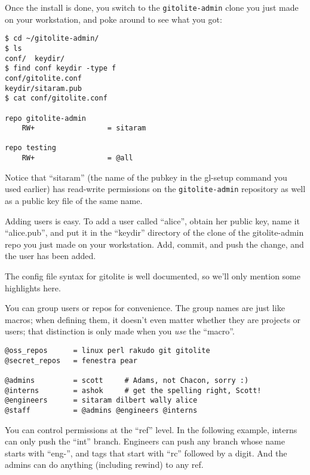 \documentclass[a4paper]{book}
\begin{document}
Once the install is done, you switch to the \texttt{gitolite-admin} clone you just made on your workstation, and poke around to see what you got:

\begin{shaded}\begin{verbatim}
$ cd ~/gitolite-admin/
$ ls
conf/  keydir/
$ find conf keydir -type f
conf/gitolite.conf
keydir/sitaram.pub
$ cat conf/gitolite.conf

repo gitolite-admin
    RW+                 = sitaram

repo testing
    RW+                 = @all
\end{verbatim}\end{shaded}

Notice that “sitaram” (the name of the pubkey in the gl-setup command you used earlier) has read-write permissions on the \texttt{gitolite-admin} repository as well as a public key file of the same name.

Adding users is easy. To add a user called “alice”, obtain her public key, name it “alice.pub”, and put it in the “keydir” directory of the clone of the gitolite-admin repo you just made on your workstation. Add, commit, and push the change, and the user has been added.

The config file syntax for gitolite is well documented, so we'll only mention some highlights here.

You can group users or repos for convenience. The group names are just like macros; when defining them, it doesn't even matter whether they are projects or users; that distinction is only made when you \emph{use} the “macro”.

\begin{shaded}\begin{verbatim}
@oss_repos      = linux perl rakudo git gitolite
@secret_repos   = fenestra pear

@admins         = scott     # Adams, not Chacon, sorry :)
@interns        = ashok     # get the spelling right, Scott!
@engineers      = sitaram dilbert wally alice
@staff          = @admins @engineers @interns
\end{verbatim}\end{shaded}

You can control permissions at the “ref” level. In the following example, interns can only push the “int” branch. Engineers can push any branch whose name starts with “eng-”, and tags that start with “rc” followed by a digit. And the admins can do anything (including rewind) to any ref.
\end{document}
